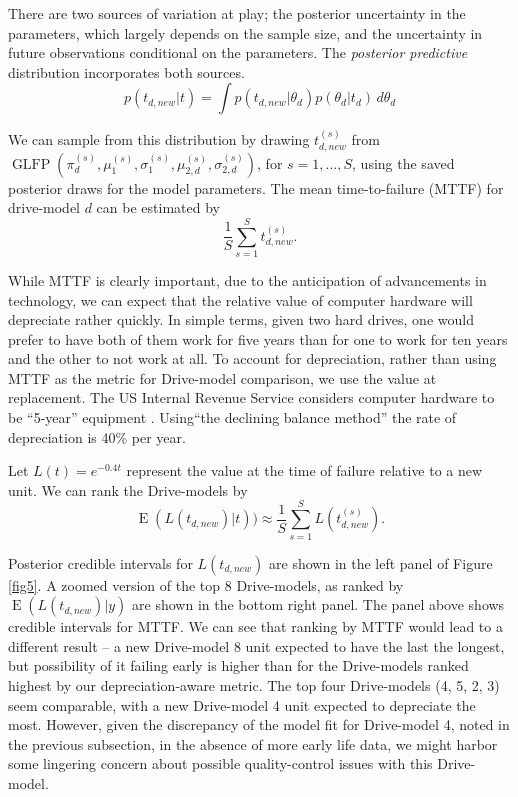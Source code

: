 \documentclass[12pt]{article}
\newcommand{\op}{\operatorname}
\begin{document}
There are two sources of variation at play; the
posterior uncertainty in the parameters, which largely depends on the
sample size, and the uncertainty in future
observations conditional on the parameters. The {\em posterior
  predictive} distribution incorporates both sources.
\begin{equation*}
  p(t_{d,new}|t) = \int p(t_{d,new}|\theta_d) p(\theta_d|t_d) \, d\theta_d
\end{equation*}

We can sample from this distribution by drawing $t_{d,new}^{(s)}$ from
$\operatorname{GLFP}(\pi_d^{(s)},
\mu_1^{(s)},\sigma_1^{(s)},\mu_{2,d}^{(s)},\sigma_{2,d}^{(s)})$, for
$s=1,...,S$, using the saved posterior draws for the model
parameters. The mean time-to-failure (MTTF) for drive-model $d$ can be estimated by
$$\frac{1}{S} \sum_{s=1}^{S} t_{d,new}^{(s)}.$$

While MTTF is clearly important, due to the
anticipation of advancements in technology, we can expect that the
relative value of computer hardware will depreciate rather quickly. In simple terms, given two hard drives, one would prefer to have both of them work for five years than for one to work for ten years and the other to not work at all. To account
for depreciation, rather than using MTTF as the metric for Drive-model comparison, we use the value at replacement. The US Internal Revenue Service considers
computer hardware to be ``5-year'' equipment \citep{f4562}. Using``the declining
balance method'' the rate of depreciation is 40\% per year.

Let $L(t) = e^{-0.4t}$ represent the value at the time of failure
relative to a new unit. We can rank the Drive-models by 
$$\op{E}(L(t_{d,new})|t))\approx \frac{1}{S} \sum_{s=1}^{S} L(t_{d,new}^{(s)}).$$

Posterior credible intervals for $L(t_{d,new})$ are shown in the left panel of Figure \ref{fig5}. A zoomed version of the top 8 Drive-models, as ranked by $\op{E}(L(t_{d,new})|y)$ are shown in the bottom right panel. The panel above shows credible intervals for MTTF. We can see that ranking by MTTF would lead to a different result -- a new Drive-model 8 unit expected to have the last the longest, but possibility of it failing early is higher than for the Drive-models ranked highest by our depreciation-aware metric. The top four Drive-models (4, 5, 2, 3) seem comparable, with a new Drive-model 4 unit expected to depreciate the most. However, given the discrepancy of the model fit for Drive-model 4, noted in the previous subsection, in the absence of more early life data, we might harbor some lingering concern about possible quality-control issues with this Drive-model.
\end{document}
